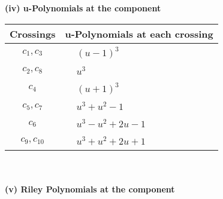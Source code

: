 \documentclass[1p]{elsarticle_modified}
\theoremstyle{definition}
\begin{document}
\newpage\renewcommand{\arraystretch}{1}
\flushleft \textbf{(iv) u-Polynomials at the component}\newline \\
\begin{tabular}{m{50pt}|m{274pt}}
Crossings & \hspace{64pt}u-Polynomials at each crossing \\
\hline $$\begin{aligned}c_{1},c_{3}\end{aligned}$$&$\begin{aligned}
&(u-1)^3
\end{aligned}$\\
\hline $$\begin{aligned}c_{2},c_{8}\end{aligned}$$&$\begin{aligned}
&u^3
\end{aligned}$\\
\hline $$\begin{aligned}c_{4}\end{aligned}$$&$\begin{aligned}
&(u+1)^3
\end{aligned}$\\
\hline $$\begin{aligned}c_{5},c_{7}\end{aligned}$$&$\begin{aligned}
&u^3+u^2-1
\end{aligned}$\\
\hline $$\begin{aligned}c_{6}\end{aligned}$$&$\begin{aligned}
&u^3- u^2+2 u-1
\end{aligned}$\\
\hline $$\begin{aligned}c_{9},c_{10}\end{aligned}$$&$\begin{aligned}
&u^3+u^2+2 u+1
\end{aligned}$\\
\hline
\end{tabular}\\~\\
\newpage\renewcommand{\arraystretch}{1}
\flushleft \textbf{(v) Riley Polynomials at the component}\newline \\
\end{document}
